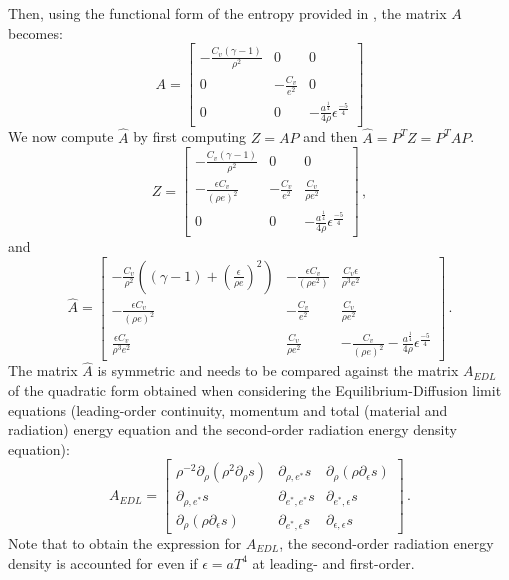 \documentclass[times,doublespace]{fldauth}%
\begin{document}
%
Then, using the functional form of the entropy provided in , the matrix $A$ becomes:
%
\begin{equation}
A = 
\begin{bmatrix}
-\frac{C_v (\gamma-1)}{\rho^2} & 0 & 0 \\
0 & -\frac{C_v}{e^2} & 0 \\
0 & 0 & -\frac{a^\frac{1}{4}}{4\rho}\epsilon^\frac{-5}{4}
\end{bmatrix}
\end{equation}
%
We now compute $\hat{A}$ by first computing $Z=AP$ and then $\hat{A} = P^T Z = P^T A P$.
%
\begin{equation}
Z = 
\begin{bmatrix}
-\frac{C_v (\gamma-1)}{\rho^2} & 0 & 0 \\
-\frac{\epsilon C_v}{(\rho e)^2} & -\frac{C_v}{e^2} & \frac{C_v}{\rho e^2} \\
0 & 0 & -\frac{a^\frac{1}{4}}{4\rho}\epsilon^\frac{-5}{4}
\end{bmatrix} \, ,
\end{equation}
%
and 
%
\begin{equation}
\hat{A} = 
\begin{bmatrix}
-\frac{C_v}{\rho^2} \left((\gamma-1)+\left(\frac{\epsilon}{\rho e}\right)^2\right) & -\frac{\epsilon C_v}{(\rho e^2)} & \frac{C_v \epsilon}{\rho^3 e^2} \\
-\frac{\epsilon C_v}{(\rho e)^2} & -\frac{C_v}{e^2} & \frac{C_v}{\rho e^2} \\
\frac{\epsilon C_v}{\rho^3 e^2} & \frac{C_v}{\rho e^2} & -\frac{C_v}{(\rho e)^2}-\frac{a^\frac{1}{4}}{4\rho}\epsilon^\frac{-5}{4}
\end{bmatrix} \, .
\end{equation}
The matrix $\hat{A}$ is symmetric and needs to be compared against the matrix $A_{EDL}$ of the quadratic form obtained when considering the Equilibrium-Diffusion limit equations (leading-order continuity, momentum and total (material and radiation) energy equation and the second-order radiation energy density equation):
%
 \begin{equation}
 A _{EDL}= 
\begin{bmatrix}
\rho^{-2}\partial_{\rho} \left( \rho^2 \partial_{\rho} s \right) & \partial_{\rho,e^*} s & \partial_{\rho} \left( \rho \partial_{\epsilon} s \right) \\
 \partial_{\rho,e^*} s & \partial_{e^*,e^*} s & \partial_{e^*,\epsilon} s \\
 \partial_{\rho} \left( \rho \partial_{\epsilon} s \right) & \partial_{e^*,\epsilon} s & \partial_{\epsilon,\epsilon} s
\end{bmatrix}
\,.
\end{equation}
%
Note that to obtain the expression for $A_{EDL}$, the second-order radiation energy density is accounted for even if $\epsilon = aT^4$ at leading- and first-order.
\end{document}
